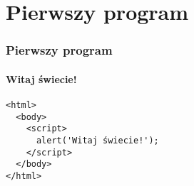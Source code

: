 \section{Pierwszy program}


\begin{frame}[fragile]
  \frametitle{Pierwszy program}
  \framesubtitle{Witaj świecie!}

  \begin{verbatim}
<html>
  <body>
    <script>
      alert('Witaj świecie!');
    </script>
  </body>
</html>
  \end{verbatim}

\end{frame}



